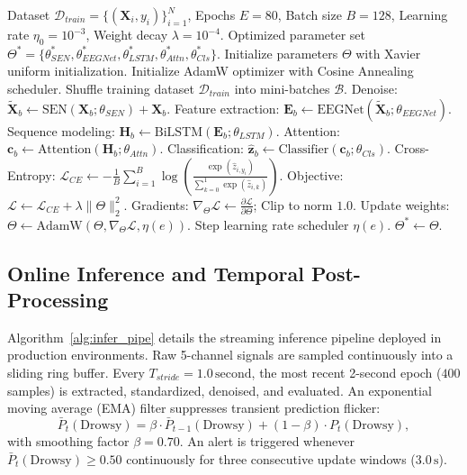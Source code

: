 \documentclass[conference]{IEEEtran}
\begin{document}
\begin{algorithm}[t]
\caption{End-to-End Training of NeuroVigi}
\label{alg:train_pipe}
\begin{algorithmic}[1]
\Require Dataset $\mathcal{D}_{train} = \{(\mathbf{X}_i, y_i)\}_{i=1}^N$, Epochs $E=80$, Batch size $B=128$, Learning rate $\eta_0 = 10^{-3}$, Weight decay $\lambda = 10^{-4}$.
\Ensure Optimized parameter set $\Theta^* = \{\theta_{SEN}^*, \theta_{EEGNet}^*, \theta_{LSTM}^*, \theta_{Attn}^*, \theta_{Cls}^*\}$.
\State Initialize parameters $\Theta$ with Xavier uniform initialization.
\State Initialize AdamW optimizer with Cosine Annealing scheduler.
  \State Shuffle training dataset $\mathcal{D}_{train}$ into mini-batches $\mathcal{B}$.
    \State Denoise: $\mathbf{\tilde{X}}_b \gets \text{SEN}(\mathbf{X}_b; \theta_{SEN}) + \mathbf{X}_b$.
    \State Feature extraction: $\mathbf{E}_b \gets \text{EEGNet}(\mathbf{\tilde{X}}_b; \theta_{EEGNet})$.
    \State Sequence modeling: $\mathbf{H}_b \gets \text{BiLSTM}(\mathbf{E}_b; \theta_{LSTM})$.
    \State Attention: $\mathbf{c}_b \gets \text{Attention}(\mathbf{H}_b; \theta_{Attn})$.
    \State Classification: $\hat{\mathbf{z}}_b \gets \text{Classifier}(\mathbf{c}_b; \theta_{Cls})$.
    \State Cross-Entropy: $\mathcal{L}_{CE} \gets -\frac{1}{B}\sum_{i=1}^B \log\left( \frac{\exp(\hat{z}_{i, y_i})}{\sum_{k=0}^1 \exp(\hat{z}_{i,k})} \right)$.
    \State Objective: $\mathcal{L} \gets \mathcal{L}_{CE} + \lambda \|\Theta\|_2^2$.
    \State Gradients: $\nabla_{\Theta} \mathcal{L} \gets \frac{\partial \mathcal{L}}{\partial \Theta}$; Clip to norm $1.0$.
    \State Update weights: $\Theta \gets \text{AdamW}(\Theta, \nabla_{\Theta}\mathcal{L}, \eta(e))$.
  \EndFor
  \State Step learning rate scheduler $\eta(e)$.
\EndFor
\State \Return $\Theta^* \gets \Theta$.
\end{algorithmic}
\end{algorithm}

\subsection{Online Inference and Temporal Post-Processing}
Algorithm~\ref{alg:infer_pipe} details the streaming inference pipeline deployed in production environments. Raw 5-channel signals are sampled continuously into a sliding ring buffer. Every $T_{stride} = 1.0\,\text{second}$, the most recent 2-second epoch ($400$ samples) is extracted, standardized, denoised, and evaluated. An exponential moving average (EMA) filter suppresses transient prediction flicker:
\begin{equation}
    \bar{P}_t(\text{Drowsy}) = \beta \cdot \bar{P}_{t-1}(\text{Drowsy}) + (1 - \beta) \cdot P_t(\text{Drowsy}),
\end{equation}
with smoothing factor $\beta = 0.70$. An alert is triggered whenever $\bar{P}_t(\text{Drowsy}) \ge 0.50$ continuously for three consecutive update windows ($3.0\,\text{s}$).
\end{document}
